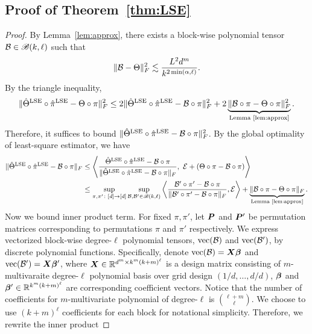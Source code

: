 \documentclass[12pt]{article}
\theoremstyle{definition}
\def\caliB{\mathscr{B}}
\begin{document}
\subsection{Proof of Theorem~\ref{thm:LSE}}\label{sec:proofLSE}
\begin{proof} By Lemma~\ref{lem:approx}, there exists a block-wise polynomial tensor $\tB\in\caliB(k,\ell)$ such that
\begin{equation}\label{eq:approx}
\lVert\mathcal{B}-\Theta\rVert_F^2\lesssim {L^2d^m\over k^{2\min(\alpha,\ell)}}.
\end{equation}
By the triangle inequality,
\begin{equation}\label{eq:tri}
\lVert\hat\Theta^\textup{LSE}\circ\hat\pi^\textup{LSE} -\Theta\circ \pi\rVert_F^2\leq 2\lVert\hat\Theta^\textup{LSE}\circ\hat\pi^\textup{LSE} -\mathcal{B}\circ \pi\rVert_F^2+2\underbrace{\lVert\mathcal{B}\circ \pi-\Theta\circ \pi\rVert_F^2}_{\textup{Lemma~\ref{lem:approx}}}.
\end{equation}
Therefore, it suffices to bound $\lVert\hat\Theta^\textup{LSE}\circ\hat\pi^\textup{LSE} -\mathcal{B}\circ \pi\rVert_F^2$. By the global optimality of least-square estimator, we have
\begin{align}
\FnormSize{}{\hat\Theta^\textup{LSE}\circ\hat\pi^\textup{LSE} -\tB\circ \pi}&\leq \left\langle {\hat \Theta^\textup{LSE}\circ \hat \pi^\textup{LSE}-\tB\circ \pi \over \FnormSize{}{ \hat \Theta^\textup{LSE}\circ \hat \pi^\textup{LSE}-\tB\circ \pi}},\ \tE+(\Theta\circ \pi-\tB\circ \pi) \right \rangle \\
&\leq \sup_{\pi, \pi'\colon[d]\to[d]}\sup_{\tB, \tB'\in \caliB(k,\ell)} \left\langle {\tB'\circ \pi'-\tB\circ \pi \over \FnormSize{}{\tB'\circ \pi'-\tB\circ \pi}}, \tE \right \rangle+\underbrace{\FnormSize{}{\tB\circ \pi-\Theta\circ \pi}}_{\textup{Lemma~\ref{lem:approx}}}.
\end{align}
Now we bound inner product term. For fixed $\pi,\pi'$, let $\bm{P}$ and $\bm{P}'$ be permutation matrices corresponding to permutations $\pi$ and $\pi'$ respectively. 
We express vectorized block-wise degree-$\ell$ polynomial tensors, $\text{vec}(\mathcal{B})$ and $\text{vec}(\mathcal{B}')$, by discrete polynomial functions. Specifically, denote $\text{vec}(\mathcal{B})=\bm X\boldsymbol{\beta}$ and $\text{vec}(\mathcal{B}')=\bm X\boldsymbol{\beta}'$, where $\bm X\in\mathbb{R}^{d^m\times k^m(k+m)^\ell}$ is a design matrix consisting of $m$-multivaraite degree-$\ell$ polynomial basis over grid design $(1/d,\ldots,d/d)$, $\boldsymbol{\beta}$ and $\boldsymbol{\beta}'\in\mathbb{R}^{k^m(k+m)^\ell}$ are corresponding coefficient vectors. Notice that the number of coefficients for $m$-multivariate polynomial of degree-$\ell$ is $\ell+m \choose \ell$. We choose to use $(k+m)^\ell$ coefficients for each block for notational simplicity. Therefore, we rewrite the inner product

\end{proof}
\end{document}
